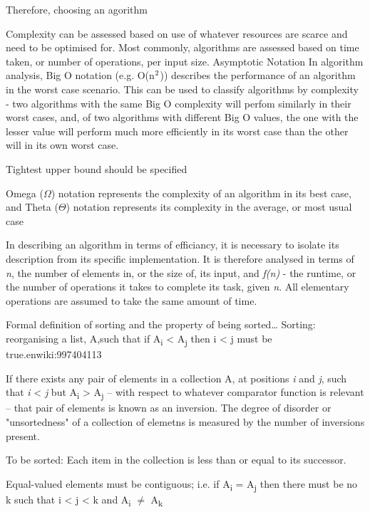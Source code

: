 \documentclass[12pt, a4paper]{article}
\begin{document}
Therefore, choosing an agorithm 

Complexity can be assessed based on use of whatever resources are scarce and need to be optimised for. Most commonly, algorithms are assessed based on time taken, or number of operations, per input size. 
Asymptotic Notation
In algorithm analysis, Big O notation (e.g. O(n$\textsuperscript{2}$)) describes the performance of an algorithm in the worst case scenario. This can be used to classify algorithms by complexity - two algorithms with the same Big O complexity will perfom similarly in their worst cases, and, of two algorithms with different Big O values, the one with the lesser value will perform much more efficiently in its worst case than the other will in its own worst case.

Tightest upper bound should be specified

Omega ($\Omega$) notation represents the complexity of an algorithm in its best case, and Theta ($\Theta$) notation represents its complexity in the average, or most usual case

In describing an algorithm in terms of efficiancy, it is necessary to isolate its description from its specific implementation. It is therefore analysed in terms of \emph{n}, the number of elements in, or the size of, its input, and \emph{f(n)} - the runtime, or the number of operations it takes to complete its task, given \emph{n}. All elementary operations are assumed to take the same amount of time.





Formal definition of sorting and the property of being sorted\dots
Sorting: reorganising a list, A,such that if A\textsubscript{i} < A\textsubscript{j} then i < j must be true.enwiki:997404113


If there exists any pair of elements in a collection A, at positions \emph{i} and \emph{j}, such that \emph{i} < \emph{j} but A\textsubscript{i} > A\textsubscript{j} -- with respect to whatever comparator function is relevant -- that pair of elements is known as an inversion. The degree of disorder or "unsortedness" of a collection of elemetns is measured by the number of inversions present.

To be sorted: Each item in the collection is less than or equal to its successor.

Equal-valued elements must be contiguous; i.e. if A\textsubscript{i} = A\textsubscript{j} then there must be no k such that i < j < k and A\textsubscript{i} $\ne$ A\textsubscript{k}
\end{document}
